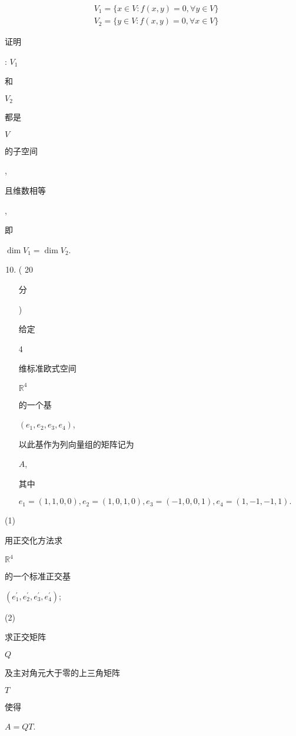 \documentclass[10pt]{article}
\begin{document}
$$
\begin{aligned}
&V_{1}=\{x \in V: f(x, y)=0, \forall y \in V\} \\
&V_{2}=\{y \in V: f(x, y)=0, \forall x \in V\}
\end{aligned}
$$
\begin{CJK}{UTF8}{mj}证明\end{CJK}: $V_{1}$ \begin{CJK}{UTF8}{mj}和\end{CJK} $V_{2}$ \begin{CJK}{UTF8}{mj}都是\end{CJK} $V$ \begin{CJK}{UTF8}{mj}的子空间\end{CJK}, \begin{CJK}{UTF8}{mj}且维数相等\end{CJK}, \begin{CJK}{UTF8}{mj}即\end{CJK} $\operatorname{dim} V_{1}=\operatorname{dim} V_{2}$.

\begin{enumerate}
  \setcounter{enumi}{9}
  \item ( 20 \begin{CJK}{UTF8}{mj}分\end{CJK}) \begin{CJK}{UTF8}{mj}给定\end{CJK} 4 \begin{CJK}{UTF8}{mj}维标准欧式空间\end{CJK} $\mathbb{R}^{4}$ \begin{CJK}{UTF8}{mj}的一个基\end{CJK} $\left(e_{1}, e_{2}, e_{3}, e_{4}\right)$, \begin{CJK}{UTF8}{mj}以此基作为列向量组的矩阵记为\end{CJK} $A$, \begin{CJK}{UTF8}{mj}其中\end{CJK} $e_{1}=(1,1,0,0), e_{2}=(1,0,1,0), e_{3}=(-1,0,0,1), e_{4}=(1,-1,-1,1) .$
\end{enumerate}
(1) \begin{CJK}{UTF8}{mj}用正交化方法求\end{CJK} $\mathbb{R}^{4}$ \begin{CJK}{UTF8}{mj}的一个标准正交基\end{CJK} $\left(e_{1}^{\prime}, e_{2}^{\prime}, e_{3}^{\prime}, e_{4}^{\prime}\right)$;

(2) \begin{CJK}{UTF8}{mj}求正交矩阵\end{CJK} $Q$ \begin{CJK}{UTF8}{mj}及主对角元大于零的上三角矩阵\end{CJK} $T$ \begin{CJK}{UTF8}{mj}使得\end{CJK} $A=Q T$.
\end{document}
